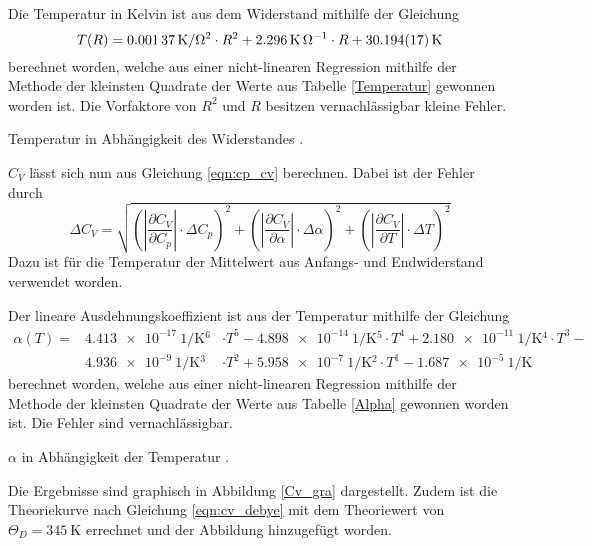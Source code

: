 Die Temperatur in Kelvin ist aus dem Widerstand mithilfe der Gleichung
\begin{equation*}
	T(R) = \SI{0.00137}{\kelvin\per\ohm^2} \cdot R^2 + \SI{2.296}{\kelvin\per\ohm} \cdot R + \SI{30.194 \pm 0.017}{\kelvin}
\end{equation*}
berechnet worden, welche aus einer nicht-linearen Regression mithilfe der Methode der kleinsten Quadrate der Werte aus Tabelle \ref{Temperatur} gewonnen worden ist.
Die Vorfaktore von $R^2$ und $R$ besitzen vernachlässigbar kleine Fehler.

\begin{table}[!h]
	\centering
	\caption[]{Temperatur in Abhängigkeit des Widerstandes \cite{V47}.}
	
	\label{Temperatur}
\end{table}

$C_V$ lässt sich nun aus Gleichung \eqref{eqn:cp_cv} 
berechnen.
Dabei ist der Fehler durch
\begin{equation*}
	\Delta C_V = \sqrt{\left(|\frac{\partial C_V}{\partial C_p}|\cdot \Delta C_p \right)^2 + \left(|\frac{\partial C_V}{\partial \alpha}|\cdot \Delta \alpha \right)^2 + \left(|\frac{\partial C_V}{\partial T}|\cdot \Delta T \right)^2}
\end{equation*}
Dazu ist für die Temperatur der Mittelwert aus Anfangs- und Endwiderstand verwendet worden.

Der lineare Ausdehnungskoeffizient ist aus der Temperatur mithilfe der Gleichung
\begin{eqnarray*}
	\alpha(T) = 
	&\SI{4.413 e-17}{1\per\kelvin^6}& \cdot T^5 -
	\SI{4.898 e-14}{1\per\kelvin^5} \cdot T^4 + 
	\SI{2.180 e-11}{1\per\kelvin^4} \cdot T^3 -\\ 
	&\SI{4.936 e-9}{1\per\kelvin^3}& \cdot T^2 + 
	\SI{5.958 e-7}{1\per\kelvin^2} \cdot T^1 - 
	\SI{1.687 e-5}{1\per\kelvin} 
\end{eqnarray*}
berechnet worden, welche aus einer nicht-linearen Regression mithilfe der Methode der kleinsten Quadrate der Werte aus Tabelle \ref{Alpha} gewonnen worden ist.
Die Fehler sind vernachlässigbar.

\begin{table}[!h]
	\centering
	\caption[]{$\alpha$ in Abhängigkeit der Temperatur \cite{V47}.}
	
	\label{Alpha}
\end{table}

Die Ergebnisse sind graphisch in Abbildung \ref{Cv_gra} dargestellt.
Zudem ist die Theoriekurve nach Gleichung \eqref{eqn:cv_debye} mit dem Theoriewert von $\Theta_D = \SI{345}{\kelvin}$ \cite{kupfer3} errechnet und der Abbildung hinzugefügt worden.

